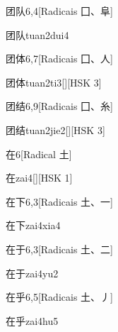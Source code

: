 \begin{entry}{团队}{6,4}[Radicais ⼞、⾩]
  \begin{phonetics}{团队}{tuan2dui4}
  \end{phonetics}
\end{entry}

\begin{entry}{团体}{6,7}[Radicais ⼞、⼈]
  \begin{phonetics}{团体}{tuan2ti3}[][HSK 3]
  \end{phonetics}
\end{entry}

\begin{entry}{团结}{6,9}[Radicais ⼞、⽷]
  \begin{phonetics}{团结}{tuan2jie2}[][HSK 3]
  \end{phonetics}
\end{entry}

\begin{entry}{在}{6}[Radical ⼟]
  \begin{phonetics}{在}{zai4}[][HSK 1]
  \end{phonetics}
\end{entry}

\begin{entry}{在下}{6,3}[Radicais ⼟、⼀]
  \begin{phonetics}{在下}{zai4xia4}
  \end{phonetics}
\end{entry}

\begin{entry}{在于}{6,3}[Radicais ⼟、⼆]
  \begin{phonetics}{在于}{zai4yu2}
  \end{phonetics}
\end{entry}

\begin{entry}{在乎}{6,5}[Radicais ⼟、⼃]
  \begin{phonetics}{在乎}{zai4hu5}
  \end{phonetics}
\end{entry}

